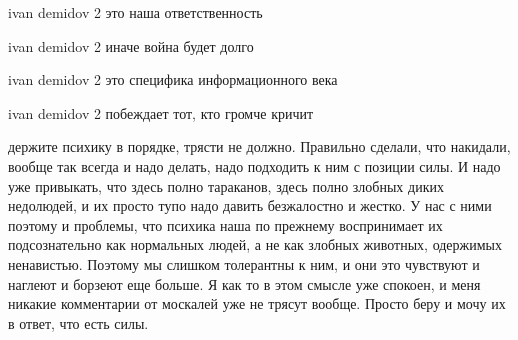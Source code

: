ivan demidov 2
это наша ответственность

ivan demidov 2
иначе война будет долго

ivan demidov 2
это специфика информационного века

ivan demidov 2
побеждает тот, кто громче кричит

держите психику в порядке, трясти не должно. Правильно сделали, что накидали,
вообще так всегда и надо делать, надо подходить к ним с позиции силы. И надо
уже привыкать, что здесь полно тараканов, здесь полно злобных диких недолюдей,
и их просто тупо надо давить безжалостно и жестко. У нас с ними поэтому и
проблемы, что психика наша по прежнему воспринимает их подсознательно как
нормальных людей, а не как злобных животных, одержимых ненавистью. Поэтому мы
слишком толерантны к ним, и они это чувствуют и наглеют и борзеют еще больше. Я
как то в этом смысле уже спокоен, и меня никакие комментарии от москалей уже не
трясут вообще. Просто беру и мочу их в ответ, что есть силы.
